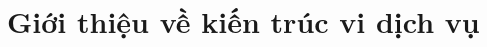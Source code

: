 \documentclass{report} %
\begin{document}
% 
% 
% 
% 
\chapter{Giới thiệu về kiến trúc vi dịch vụ}



\end{document}
